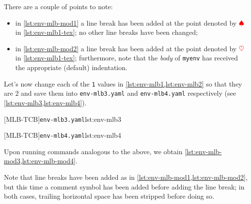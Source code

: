 	There are a couple of points to note:
	\begin{itemize}
		\item in \cref{lst:env-mlb-mod1} a line break has been added at the point denoted by $\color{red}\spadesuit$ in \cref{lst:env-mlb1-tex}; no
		      other line breaks have been changed;
		\item in \cref{lst:env-mlb-mod2} a line break has been added at the point denoted by $\color{red}\heartsuit$ in \cref{lst:env-mlb1-tex};
		      furthermore, note that the \emph{body} of \texttt{myenv} has received the appropriate (default) indentation.
	\end{itemize}

	Let's now change each of the \texttt{1} values in \cref{lst:env-mlb1,lst:env-mlb2} so that they are $2$ and
	save them into \texttt{env-mlb3.yaml} and \texttt{env-mlb4.yaml} respectively (see \cref{lst:env-mlb3,lst:env-mlb4}).

	\begin{minipage}{.45\textwidth}
		[MLB-TCB]{\texttt{env-mlb3.yaml}}{lst:env-mlb3}
	\end{minipage}
	\hfill
	\begin{minipage}{.45\textwidth}
		[MLB-TCB]{\texttt{env-mlb4.yaml}}{lst:env-mlb4}
	\end{minipage}

	Upon running  commands analogous to the above, we obtain \cref{lst:env-mlb-mod3,lst:env-mlb-mod4}.

	\begin{widepage}
		\begin{minipage}{.56\linewidth}
		\end{minipage}
		\hfill
		\begin{minipage}{.43\linewidth}
		\end{minipage}
	\end{widepage}

	Note that line breaks have been added as in \cref{lst:env-mlb-mod1,lst:env-mlb-mod2}, but this time a comment symbol
	has been added before adding the line break; in both cases, trailing horizontal
	space has been stripped before doing so.

